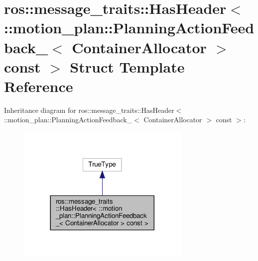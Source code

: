 \hypertarget{structros_1_1message__traits_1_1HasHeader_3_01_1_1motion__plan_1_1PlanningActionFeedback___3_01C7fb96d8b95ca46e5ff0c4b5bef76efe9}{}\section{ros\+:\+:message\+\_\+traits\+:\+:Has\+Header$<$ \+:\+:motion\+\_\+plan\+:\+:Planning\+Action\+Feedback\+\_\+$<$ Container\+Allocator $>$ const $>$ Struct Template Reference}
\label{structros_1_1message__traits_1_1HasHeader_3_01_1_1motion__plan_1_1PlanningActionFeedback___3_01C7fb96d8b95ca46e5ff0c4b5bef76efe9}


Inheritance diagram for ros\+:\+:message\+\_\+traits\+:\+:Has\+Header$<$ \+:\+:motion\+\_\+plan\+:\+:Planning\+Action\+Feedback\+\_\+$<$ Container\+Allocator $>$ const $>$\+:
\nopagebreak
\begin{figure}[H]
\begin{center}
\leavevmode
\includegraphics[width=236pt]{structros_1_1message__traits_1_1HasHeader_3_01_1_1motion__plan_1_1PlanningActionFeedback___3_01Ca3f2627f814b94d4485ffef682280f8a}
\end{center}
\end{figure}



